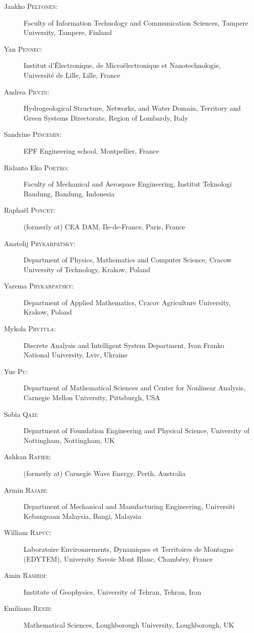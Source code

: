 \begin{description}
  \item[Jaakko \textsc{Peltonen}:] Faculty of Information Technology and Communication Sciences, Tampere University, Tampere, Finland
  \item[Yan \textsc{Pennec}:] Institut d'\'Electronique, de Micro\'electronique et Nanotechnologie, Universit\'e de Lille, Lille, France
  \item[Andrea \textsc{Piccin}:] Hydrogeological Structure, Networks, and Water Domain, Territory and Green Systems Directorate, Region of Lombardy, Italy
  \item[Sandrine \textsc{Pincemin}:] EPF Engineering school, Montpellier, France
  \item[Ridanto Eko \textsc{Poetro}:] Faculty of Mechanical and Aerospace Engineering, Institut Teknologi Bandung, Bandung, Indonesia
  \item[Rapha\"el \textsc{Poncet}:] (formerly at) CEA DAM, Ile-de-France, Paris, France
  \item[Anatolij \textsc{Prykarpatsky}:] Department of Physics, Mathematics and Computer Science, Cracow University of Technology, Krakow, Poland
  \item[Yarema \textsc{Prykarpatsky}:] Department of Applied Mathematics, Cracov Agriculture University, Krakow, Poland
  \item[Mykola \textsc{Prytula}:] Discrete Analysis and Intelligent System Department, Ivan Franko National University, Lviv, Ukraine
  \item[Yue \textsc{Pu}:] Department of Mathematical Sciences and Center for Nonlinear Analysis, Carnegie Mellon University, Pittsburgh, USA
  \item[Sobia \textsc{Qazi}:] Department of Foundation Engineering and Physical Science, University of Nottingham, Nottingham, UK
  \item[Ashkan \textsc{Rafiee}:] (formerly at) Carnegie Wave Energy, Perth, Australia
  \item[Armin \textsc{Rajabi}:] Department of Mechanical and Manufacturing Engineering, Universiti Kebangsaan Malaysia, Bangi, Malaysia
  \item[William \textsc{Rapuc}:] Laboratoire Environnements, Dynamiques et Territoires de Montagne (EDYTEM), University Savoie Mont Blanc, Chamb\'ery, France
  \item[Amin \textsc{Rashidi}:] Institute of Geophysics, University of Tehran, Tehran, Iran
  \item[Emiliano \textsc{Renzi}:] Mathematical Sciences, Loughborough University, Loughborough, UK

\end{description}
